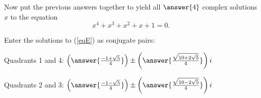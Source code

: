 \documentclass[space,nooutcomes]{ximera}
\begin{document}
\begin{problem}
Now put the previous answers together to yield all $\answer{4}$ complex solutions $x$ to the equation
\begin{equation} \label{eqE}
x^4+x^3+x^2+x+1=0.
\end{equation}

Enter the solutions to (\ref{eqE}) as conjugate pairs: 

Quadrants 1 and 4: $\left(\answer{\frac{-1+\sqrt{5}}{4}}\right) 
     \pm \left(\answer{\frac{\sqrt{10+2\sqrt{5}}}{4}}\right)i$

Quadrants 2 and 3: $\left(\answer{\frac{-1-\sqrt{5}}{4}}\right)
     \pm \left(\answer{\frac{\sqrt{10-2\sqrt{5}}}{4}}\right)i$ 



\end{problem}
\end{document}
